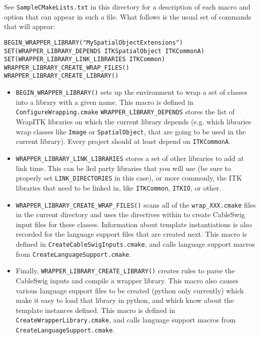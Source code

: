\documentclass{InsightArticle}
\begin{document}
See \verb$SampleCMakeLists.txt$ in this directory for a description of each macro and
option that can appear in such a file. What follows is the usual set of commands
that will appear:

\small \begin{verbatim}
BEGIN_WRAPPER_LIBRARY("MySpatialObjectExtensions")
SET(WRAPPER_LIBRARY_DEPENDS ITKSpatialObject ITKCommonA)
SET(WRAPPER_LIBRARY_LINK_LIBRARIES ITKCommon)
WRAPPER_LIBRARY_CREATE_WRAP_FILES()
WRAPPER_LIBRARY_CREATE_LIBRARY()
\end{verbatim} \normalsize

\begin{itemize}
  \item \verb$BEGIN_WRAPPER_LIBRARY()$ sets up the environment to wrap a set of classes into a
library with a given name. This macro is defined in \verb$ConfigureWrapping.cmake$
\verb$WRAPPER_LIBRARY_DEPENDS$ stores the list of WrapITK libraries on which the
current library depends (e.g. which libraries wrap classes like \verb$Image$ or
\verb$SpatialObject$, that are going to be used in the current library). Every project
should at least depend on \verb$ITKCommonA$.

  \item \verb$WRAPPER_LIBRARY_LINK_LIBRARIES$ stores a set of other libraries to add at link
time. This can be 3rd party libraries that you will use (be sure to properly set
\verb$LINK_DIRECTORIES$ in this case), or more commonly, the ITK libraries that need to
be linked in, like \verb$ITKCommon$, \verb$ITKIO$, or other. 

  \item \verb$WRAPPER_LIBRARY_CREATE_WRAP_FILES()$ scans all of the \verb$wrap_XXX.cmake$ files in the
current directory and uses the directives within to create CableSwig input files
for these classes. Information about template instantiations is also recorded
for the language support files that are created next. This macro is defined in
\verb$CreateCableSwigInputs.cmake$, and calls language support macros from
\verb$CreateLanguageSupport.cmake$.

  \item Finally, \verb$WRAPPER_LIBRARY_CREATE_LIBRARY()$ creates rules to parse the CableSwig
inputs and compile a wrapper library. This macro also causes various language
support files to be created (python only currently) which make it easy to load
that library in python, and which know about the template instances defined.
This macro is defined in \verb$CreateWrapperLibrary.cmake$, and calls language support
macros from \verb$CreateLanguageSupport.cmake$.
\end{itemize}
\end{document}
